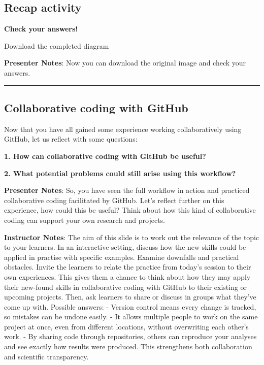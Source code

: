 \documentclass[
  letterpaper,
  DIV=11,
  numbers=noendperiod]{scrartcl}
\begin{document}
\subsection{Recap activity}\label{recap-activity-1}

\textbf{Check your answers!}

Download the completed diagram

\textbf{Presenter Notes}: Now you can download the original image and
check your answers.

\begin{center}\rule{0.5\linewidth}{0.5pt}\end{center}

\subsection{Collaborative coding with
GitHub}\label{collaborative-coding-with-github}

Now that you have all gained some experience working collaboratively
using GitHub, let us reflect with some questions:

\textbf{1. How can collaborative coding with GitHub be useful?}

\textbf{2. What potential problems could still arise using this
workflow?}

\textbf{Presenter Notes}: So, you have seen the full workflow in action
and practiced collaborative coding facilitated by GitHub. Let's reflect
further on this experience, how could this be useful? Think about how
this kind of collaborative coding can support your own research and
projects.

\textbf{Instructor Notes}: The aim of this slide is to work out the
relevance of the topic to your learners. In an interactive setting,
discuss how the new skills could be applied in practise with specific
examples. Examine downfalls and practical obstacles. Invite the learners
to relate the practice from today's session to their own experiences.
This gives them a chance to think about how they may apply their
new-found skills in collaborative coding with GitHub to their existing
or upcoming projects. Then, ask learners to share or discuss in groups
what they've come up with. Possible answers: - Version control means
every change is tracked, so mistakes can be undone easily. - It allows
multiple people to work on the same project at once, even from different
locations, without overwriting each other's work. - By sharing code
through repositories, others can reproduce your analyses and see exactly
how results were produced. This strengthens both collaboration and
scientific transparency.
\end{document}
